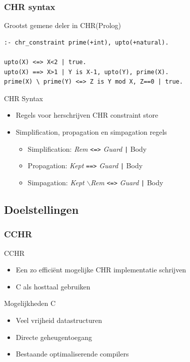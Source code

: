 \documentclass{beamer}
\newcommand{\bs}{$\backslash$}
\newcommand{\code}[1]{{\tt #1}}
\begin{document}
\begin{frame}[containsverbatim]
  \frametitle{CHR syntax}
  \begin{example}{Grootst gemene deler in CHR(Prolog)}
\begin{Verbatim}
:- chr_constraint prime(+int), upto(+natural).

upto(X) <=> X<2 | true.
upto(X) ==> X>1 | Y is X-1, upto(Y), prime(X).
prime(X) \ prime(Y) <=> Z is Y mod X, Z==0 | true.
\end{Verbatim}
  \end{example}

  \begin{block}{CHR Syntax}
    \begin{itemize}
      \item Regels voor herschrijven CHR constraint store
      \item Simplification, propagation en simpagation regels \begin{itemize}
        \item Simplification: {\em Rem} \code{<=>} {\em Guard} \code{|} {Body}
        \item Propagation: {\em Kept} \code{==>} {\em Guard} \code{|} {Body}
        \item Simpagation: {\em Kept} \bs {\em Rem} \code{<=>} {\em Guard} \code{|} {Body}
      \end{itemize}
    \end{itemize}
  \end{block}
\end{frame}

\subsection{Doelstellingen}

\begin{frame}
  \frametitle{CCHR}
  \begin{block}{CCHR}
    \begin{itemize}
      \item Een zo effici\"ent mogelijke CHR implementatie schrijven
      \item C als hosttaal gebruiken
    \end{itemize}
  \end{block}

  \begin{block}{Mogelijkheden C}
    \begin{itemize}
      \item Veel vrijheid datastructuren
      \item Directe geheugentoegang
      \item Bestaande optimaliserende compilers
    \end{itemize}
  \end{block}

\end{frame}
\end{document}
